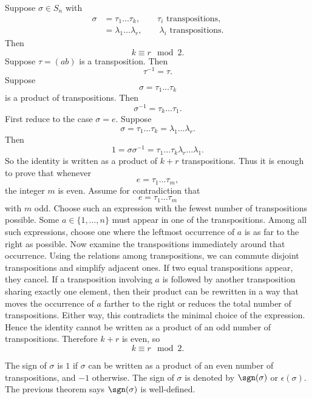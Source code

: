 \begin{theorem}{
    Suppose $\sigma\in S_n$ with
    \begin{align*}
        \sigma &= \tau_{1}\dots \tau_{k}, \qquad \tau_{i}\text{ transpositions}, \\
        &= \lambda_{1}\dots \lambda_{r}, \qquad \lambda_{i}\text{ transpositions}.
    \end{align*}
    Then
    \[
        k\equiv r\mod 2.
    \]
}
    Suppose $\tau=(ab)$ is a transposition.
    Then
    \[
        \tau^{-1}=\tau.
    \]
    Suppose
    \[
        \sigma=\tau_{1}\dots \tau_{k}
    \]
    is a product of transpositions.
    Then
    \[
        \sigma^{-1}=\tau_{k}\dots \tau_{1}.
    \]
    First reduce to the case $\sigma=e$.
    Suppose
    \[
        \sigma=\tau_{1}\dots \tau_{k}=\lambda_{1}\dots \lambda_{r}.
    \]
    Then
    \[
        1=\sigma\sigma^{-1}=\tau_{1}\dots \tau_{k}\lambda_{r}\dots \lambda_{1}.
    \]
    So the identity is written as a product of $k+r$ transpositions.
    Thus it is enough to prove that whenever
    \[
        e=\tau_{1}\dots \tau_{m},
    \]
    the integer $m$ is even.
    Assume for contradiction that
    \[
        e=\tau_{1}\dots \tau_{m}
    \]
    with $m$ odd.
    Choose such an expression with the fewest number of transpositions possible.
    Some $a\in\{1,\dots,n\}$ must appear in one of the transpositions.
    Among all such expressions, choose one where the leftmost occurrence of $a$ is as far to the right as possible.
    Now examine the transpositions immediately around that occurrence.
    Using the relations among transpositions, we can commute disjoint transpositions and simplify adjacent ones.
    If two equal transpositions appear, they cancel.
    If a transposition involving $a$ is followed by another transposition sharing exactly one element, then their product can be rewritten in a way that moves the occurrence of $a$ farther to the right or reduces the total number of transpositions.
    Either way, this contradicts the minimal choice of the expression.
    Hence the identity cannot be written as a product of an odd number of transpositions.
    Therefore $k+r$ is even, so
    \[
        k\equiv r\mod 2.
    \]
\end{theorem}

\begin{definition}[Sign]
    The sign of $\sigma$ is $1$ if $\sigma$ can be written as a product of an even number of transpositions, and $-1$ otherwise.
    The sign of $\sigma$ is denoted by $\sgn(\sigma)$ or $\epsilon(\sigma)$.
    The previous theorem says $\sgn(\sigma)$ is well-defined.
\end{definition}

